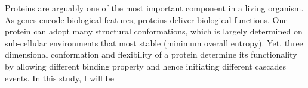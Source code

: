 Proteins are arguably one of the most important component in a living organism. As genes encode biological features, proteins deliver biological functions. One protein can adopt many structural conformations, which is largely determined on sub-cellular environments that most stable (minimum overall entropy). Yet, three dimensional conformation and flexibility of a protein determine its functionality by allowing different binding property and hence initiating different cascades events.   In this study, I will be 